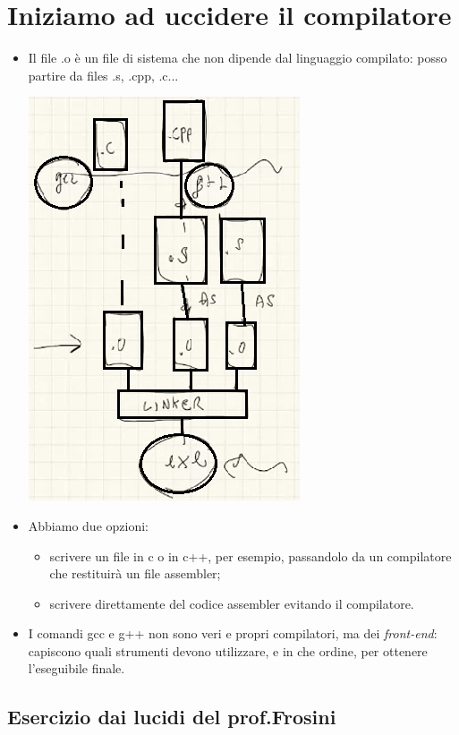 \documentclass[11pt]{report}
\theoremstyle{definition}
\begin{document}
\section{Iniziamo ad uccidere il compilatore}
\begin{itemize}
\item Il file .o è un file di sistema che non dipende dal linguaggio compilato: posso partire da files .s, .cpp, .c...
\begin{center}
\includegraphics[scale=0.90]{img/12.PNG}
\end{center} 
\item Abbiamo due opzioni:
\begin{itemize}
\item scrivere un file in c o in c++, per esempio, passandolo da un compilatore che restituirà un file assembler;
\item scrivere direttamente del codice assembler evitando il compilatore.
\end{itemize}
\item I comandi gcc e g++ non sono veri e propri compilatori, ma dei \emph{front-end}: capiscono quali strumenti devono utilizzare, e in che ordine, per ottenere l'eseguibile  finale.
\end{itemize}
\clearpage

\subsection{Esercizio dai lucidi del prof.Frosini} 
\end{document}
